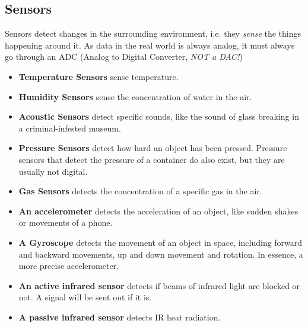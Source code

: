 \documentclass[../main.tex]{subfiles}
\begin{document}
\subsection{Sensors}

Sensors detect changes in the surrounding environment, i.e. they \emph{sense} the things happening around it. As data in the real world is always analog, it must always go through an ADC (Analog to Digital Converter, \emph{NOT a DAC!})

\begin{itemize}
    \item \textbf{Temperature Sensors} sense temperature.
    \item \textbf{Humidity Sensors} sense the concentration of water in the air.
    \item \textbf{Acoustic Sensors} detect specific sounds, like the sound of glass breaking in a criminal-infested museum.
    \item \textbf{Pressure Sensors} detect how hard an object has been pressed. Pressure sensors that detect the pressure of a container do also exist, but they are usually not digital.
    \item \textbf{Gas Sensors} detects the concentration of a specific gas in the air.
    \item \textbf{An accelerometer} detects the acceleration of an object, like sudden shakes or movements of a phone.
    \item \textbf{A Gyroscope} detects the movement of an object in space, including forward and backward movements, up and down movement and rotation. In essence, a more precise accelerometer.
    \item \textbf{An active infrared sensor} detects if beams of infrared light are blocked or not. A signal will be sent out if it is.
    \item \textbf{A passive infrared sensor} detects IR heat radiation.
\end{itemize}
\end{document}

